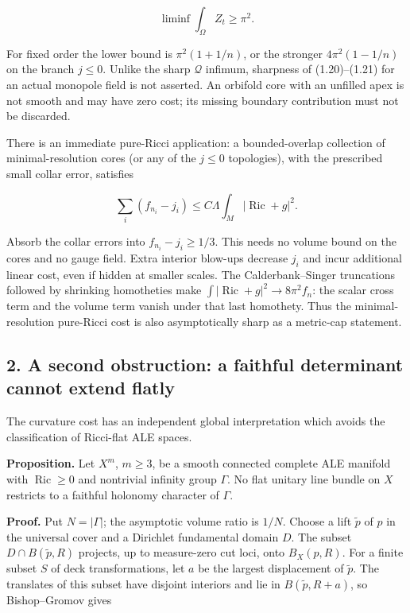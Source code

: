 \documentclass[
  10pt,
]{article}
\begin{document}
\[
                       \boxed{\liminf\int_\Omega Z_t\ge\pi^2.} \tag{1.21}
\]

For fixed order the lower bound is \(\pi^2(1+1/n)\), or the stronger
\(4\pi^2(1-1/n)\) on the branch \(j\le0\). Unlike the sharp
\(\mathscr Q\) infimum, sharpness of (1.20)--(1.21) for an actual
monopole field is not asserted. An orbifold core with an unfilled apex
is not smooth and may have zero cost; its missing boundary contribution
must not be discarded.

There is an immediate pure-Ricci application: a bounded-overlap
collection of minimal-resolution cores (or any of the \(j\le0\)
topologies), with the prescribed small collar error, satisfies

\[
 \sum_i(f_{n_i}-j_i)\le C\Lambda
                         \int_M|\operatorname{Ric}+g|^2.        \tag{1.22}
\]

Absorb the collar errors into \(f_{n_i}-j_i\ge1/3\). This needs no
volume bound on the cores and no gauge field. Extra interior blow-ups
decrease \(j_i\) and incur additional linear cost, even if hidden at
smaller scales. The Calderbank--Singer truncations followed by shrinking
homotheties make \(\int|\operatorname{Ric}+g|^2\to8\pi^2f_n\): the
scalar cross term and the volume term vanish under that last homothety.
Thus the minimal-resolution pure-Ricci cost is also asymptotically sharp
as a metric-cap statement.

\hypertarget{a-second-obstruction-a-faithful-determinant-cannot-extend-flatly}{%
\subsection{2. A second obstruction: a faithful determinant cannot
extend
flatly}\label{a-second-obstruction-a-faithful-determinant-cannot-extend-flatly}}

The curvature cost has an independent global interpretation which avoids
the classification of Ricci-flat ALE spaces.

\textbf{Proposition.} Let \(X^m\), \(m\ge3\), be a smooth connected
complete ALE manifold with \(\operatorname{Ric}\ge0\) and nontrivial
infinity group \(\Gamma\). No flat unitary line bundle on \(X\)
restricts to a faithful holonomy character of \(\Gamma\).

\textbf{Proof.} Put \(N=|\Gamma|\); the asymptotic volume ratio is
\(1/N\). Choose a lift \(\tilde p\) of \(p\) in the universal cover and
a Dirichlet fundamental domain \(D\). The subset \(D\cap B(\tilde p,R)\)
projects, up to measure-zero cut loci, onto \(B_X(p,R)\). For a finite
subset \(S\) of deck transformations, let \(a\) be the largest
displacement of \(\tilde p\). The translates of this subset have
disjoint interiors and lie in \(B(\tilde p,R+a)\), so Bishop--Gromov
gives
\end{document}
